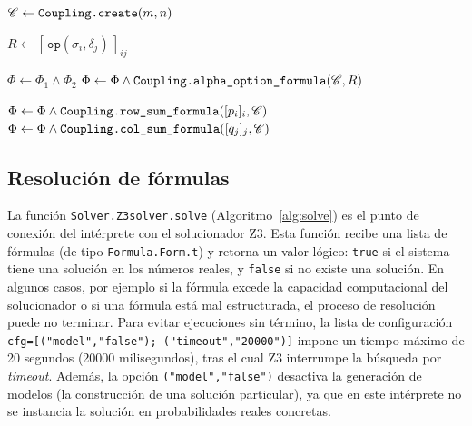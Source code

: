 \begin{algorithm}[H]
\caption{Patrón común para operaciones sobre tipos de distribución}
\label{alg:typeop}

$\mathscr{C} \leftarrow \texttt{Coupling.create}(m,n)$ 

$R \leftarrow [\,\texttt{op}(\sigma_i,\delta_j)\,]_{ij}$ 

\BlankLine


$\Phi \leftarrow \Phi_1 \land \Phi_2$ 
{$\Phi \leftarrow \Phi \land \texttt{Coupling.alpha\_option\_formula}(\mathscr{C},R)$}

$\Phi \leftarrow \Phi \land \texttt{Coupling.row\_sum\_formula}([p_i]_i,\mathscr{C})$\;
$\Phi \leftarrow \Phi \land \texttt{Coupling.col\_sum\_formula}([q_j]_j,\mathscr{C})$\;
\BlankLine

\end{algorithm}


\subsection{Resolución de fórmulas}
\label{sec:impl-rutinas-solver}

La función \verb|Solver.Z3solver.solve| (Algoritmo~\ref{alg:solve}) es
el punto de conexión del intérprete con el solucionador Z3. Esta
función recibe una lista de fórmulas (de tipo \verb|Formula.Form.t|) y
retorna un valor lógico: \verb|true| si el sistema tiene una solución
en los números reales, y \verb|false| si no existe una
solución. En algunos casos, por ejemplo si la fórmula
  excede la capacidad computacional del solucionador o si una fórmula
  está mal estructurada, el proceso de resolución puede no terminar.
  Para evitar ejecuciones sin término, la lista de configuración
  \verb|cfg=[("model","false"); ("timeout","20000")]| impone un tiempo
  máximo de 20 segundos (20000 milisegundos), tras el cual Z3
  interrumpe la búsqueda por \emph{timeout}. Además, la opción
  \verb|("model","false")| desactiva la generación de modelos (la
  construcción de una solución particular), ya que en este intérprete
  no se instancia la solución en probabilidades reales concretas.


